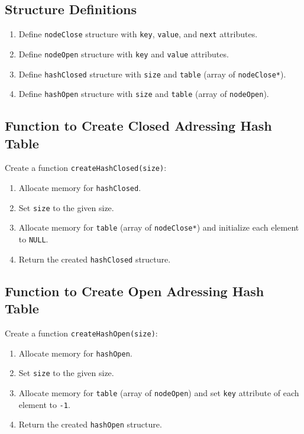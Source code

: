  {\selectfont

  \subsection{Structure Definitions}
  \begin{enumerate}[label=\arabic*.,left=0pt]
    \item Define \texttt{nodeClose} structure with \texttt{key}, \texttt{value}, and \texttt{next} attributes.
    \item Define \texttt{nodeOpen} structure with \texttt{key} and \texttt{value} attributes.
    \item Define \texttt{hashClosed} structure with \texttt{size} and \texttt{table} (array of \texttt{nodeClose*}).
    \item Define \texttt{hashOpen} structure with \texttt{size} and \texttt{table} (array of \texttt{nodeOpen}).
  \end{enumerate}

  \subsection{Function to Create Closed Adressing Hash Table}
  Create a function \texttt{createHashClosed(size)}:
  \begin{enumerate}[label=2.\arabic*.,left=0pt]
    \item Allocate memory for \texttt{hashClosed}.
    \item Set \texttt{size} to the given size.
    \item Allocate memory for \texttt{table} (array of \texttt{nodeClose*}) and initialize each element to \texttt{NULL}.
    \item Return the created \texttt{hashClosed} structure.
  \end{enumerate}

  \subsection{Function to Create Open Adressing Hash Table}
  Create a function \texttt{createHashOpen(size)}:
  \begin{enumerate}[label=\arabic*.,left=0pt]
    \item Allocate memory for \texttt{hashOpen}.
    \item Set \texttt{size} to the given size.
    \item Allocate memory for \texttt{table} (array of \texttt{nodeOpen}) and set \texttt{key} attribute of each element to \texttt{-1}.
    \item Return the created \texttt{hashOpen} structure.
  \end{enumerate}

}
